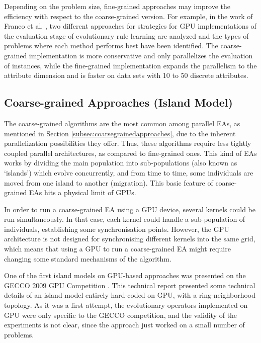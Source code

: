 \documentclass{article}
\begin{document}
Depending on the problem size, fine-grained approaches may improve the
efficiency with respect to the coarse-grained version. For example, in
the work of Franco et al. \cite{Franco15LargeScale}, two different
approaches for strategies for GPU implementations of the evaluation
stage of evolutionary rule learning are analyzed and the types of
problems where each method performs best have been identified. The
coarse-grained implementation is more conservative and only
parallelizes the evaluation of instances, while the fine-grained
implementation expands the parallelism to the attribute dimension and
is faster on data sets with 10 to 50 discrete attributes.


\subsection{Coarse-grained Approaches (Island Model)}

The coarse-grained algorithms are the most common among parallel EAs, as mentioned in Section \ref{subsec:coarsegrainedapproaches}, due to the inherent parallelization possibilities they offer. Thus, these algorithms require less tightly coupled parallel architectures, as compared to fine-grained ones.
This kind of EAs works by dividing the main population into sub-populations (also known as `islands') which evolve concurrently, and from time to time, some individuals are moved from one island to another (migration).
This basic feature of coarse-grained EAs hits a physical limit of
GPUs.

In order to run a coarse-grained EA using a GPU device, several kernels could be run simultaneously. In that case, each kernel could handle a sub-population of individuals, establishing some synchronisation points.
However, the GPU architecture is not designed for synchronising
different kernels into the same grid, which means that using a GPU to
run a coarse-grained EA might require changing some standard mechanisms
of the algorithm.


One of the first island models on GPU-based approaches was presented on the GECCO 2009 GPU Competition \cite{gecco2009CompetitionPospichal}. This technical report presented some technical details of an island model entirely hard-coded on GPU, with a ring-neighborhood topology. As it was a first attempt, the evolutionary operators implemented on GPU were only specific to the GECCO competition, and the validity of the experiments is not clear, since the approach just worked on a small number of problems.
\end{document}
